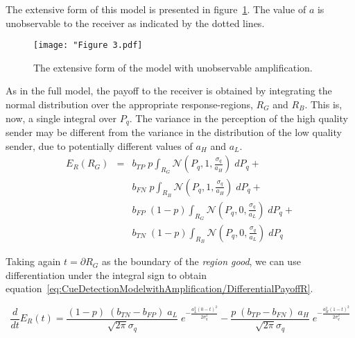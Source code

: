 \documentclass[a4paper,12pt]{article}
\numberwithin{equation}{section}
\numberwithin{figure}{section}
\begin{document}
\newpage

The extensive form of this model is presented in figure~\ref{fig:Figure 3.pdf}. The value of $a$ is unobservable to the receiver as indicated by the dotted lines.

\begin{figure}[!h]
\begin{center}
\leavevmode
\texttt{[image: "Figure 3.pdf]}
\caption[]{The extensive form of the model with unobservable amplification.}
\label{fig:Figure 3.pdf}
\end{center}
\end{figure}

As in the full model, the payoff to the receiver is obtained by integrating the normal distribution over the appropriate response-regions, $R_{G}$ and $R_{B}$. This is, now, a single integral over $P_{q}$. The variance in the perception of the high quality sender may be different from the variance in the distribution of the low quality sender, due to potentially different values of $a_{H}$ and $a_{L}$.
\begin{equation}
\label{eq:CueDetectionModelwithAmplification/PayoffR}
\begin{array}{rcl}
E_{R}(R_{G}) &=& b_{TP} \; p \displaystyle \int_{R_{G}} \mathcal{N}(P_{q}, 1, \frac{\sigma_{q}}{a_{H}}) \; dP_{q} +\\
&&b_{FN} \; p \displaystyle \int_{R_{B}} \mathcal{N}(P_{q}, 1, \frac{\sigma_{q}}{a_{H}}) \; dP_{q} +\\
&&b_{FP} \; (1-p) \displaystyle \int_{R_{G}} \mathcal{N}(P_{q}, 0, \frac{\sigma_{q}}{a_{L}}) \; dP_{q} +\\
&&b_{TN} \; (1-p) \displaystyle \int_{R_{B}} \mathcal{N}(P_{q}, 0, \frac{\sigma_{q}}{a_{L}}) \; dP_{q}
\end{array}
\end{equation}

Taking again $t=\partial R_{G}$ as the boundary of the \textit{region good}, we can use differentiation under the integral sign to obtain equation~\ref{eq:CueDetectionModelwithAmplification/DifferentialPayoffR}.

\begin{equation}
\label{eq:CueDetectionModelwithAmplification/DifferentialPayoffR}
\frac{d}{dt}E_{R}(t)= \frac{(1-p) \; (b_{TN}-b_{FP}) \; a_{L}}{\sqrt{2 \pi} \sigma_{q}} \; e^{-\frac{a_{L}^{2} (0-t)^2}{2 \sigma_{q}^2}} - \frac{p \; (b_{TP}-b_{FN}) \; a_{H}}{\sqrt{2 \pi} \sigma_{q}} \; e^{-\frac{a_{H}^{2} (1-t)^2}{2 \sigma_{q}^2}}
\end{equation}
\end{document}
